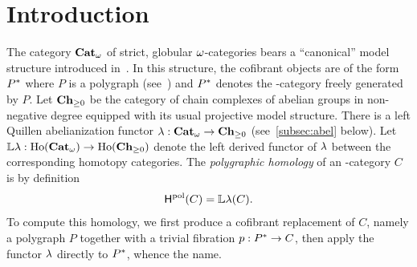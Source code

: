 \section{Introduction}\label{sec:intro}

The category $\mathbf{Cat}_{\omega}$ of strict, globular $\omega$-categories bears a
``canonical'' model structure introduced
in~\cite{lafontetal:folkms}. In this structure, the cofibrant objects
are of the form $P^*$ where $P$ is a polygraph
(see~\cite{abgmmm:polybk}) and $P^*$ denotes the \oo-category
freely generated by $P$. Let $\mathbf{Ch}_{\geq 0}$ be the category of chain complexes
of abelian groups in non-negative degree equipped with its usual
projective model structure. There is a left Quillen abelianization
functor $\mathsf{\lambda}:\mathbf{Cat}_{\omega}\to \mathbf{Ch}_{\geq 0}$ (see~\ref{subsec:abel} below). Let $\mathbb{L}\mathsf{\lambda}:\mathrm{Ho}(\mathbf{Cat}_{\omega})\to\mathrm{Ho}(\mathbf{Ch}_{\geq 0})$ denote the
left derived functor of $\mathsf{\lambda}$ between the corresponding homotopy
categories. The {\em polygraphic homology} of an \oo-category $C$
is by definition
\[\mathsf{H}^{\mathrm{pol}}(C)=\mathbb{L}\mathsf{\lambda}(C).\]
To compute this homology, we first produce
a cofibrant replacement of $C$, namely a polygraph $P$ together with 
a trivial fibration $p:P^*\to C$, then apply the functor $\mathsf{\lambda}$
directly to $P^*$, whence the name.

